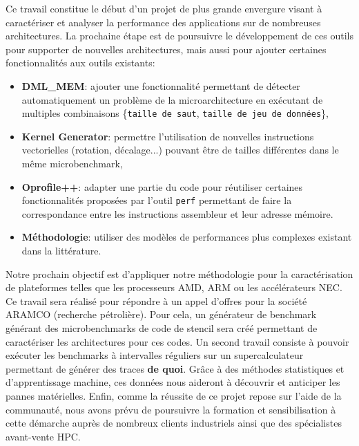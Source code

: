     Ce travail constitue le début d'un projet de plus grande envergure visant à caractériser et analyser la performance des applications sur de nombreuses architectures. La prochaine étape est de poursuivre le développement de ces outils pour supporter de nouvelles architectures, mais aussi pour ajouter certaines fonctionnalités aux outils existants:
    \begin{itemize}
        \item \textbf{DML\_MEM}: ajouter une fonctionnalité permettant de détecter automatiquement un problème de la microarchitecture en exécutant de multiples combinaisons \{\verb|taille de saut|, \verb|taille de jeu de données|\},
        \item \textbf{Kernel Generator}: permettre l'utilisation de nouvelles instructions vectorielles (rotation, décalage...) pouvant être de tailles différentes dans le même microbenchmark,
        \item \textbf{Oprofile++}: adapter une partie du code pour réutiliser certaines fonctionnalités proposées par l'outil \verb|perf| permettant de faire la correspondance entre les instructions assembleur et leur adresse mémoire.
        \item \textbf{Méthodologie}: utiliser des modèles de performances plus complexes existant dans la littérature.
    \end{itemize}

    Notre prochain objectif est d’appliquer notre méthodologie pour la caractérisation de plateformes telles que les processeurs AMD, ARM ou les accélérateurs NEC. Ce travail sera réalisé pour répondre à un appel d’offres pour la société ARAMCO (recherche pétrolière). Pour cela, un générateur de benchmark générant des microbenchmarks de code de stencil sera créé permettant de caractériser les architectures pour ces codes. Un second travail consiste à pouvoir exécuter les benchmarks à intervalles réguliers sur un supercalculateur permettant de générer des traces \textbf{de quoi}. Grâce à des méthodes statistiques et d'apprentissage machine, ces données nous aideront à découvrir et anticiper les pannes matérielles. Enfin, comme la réussite de ce projet repose sur l’aide de la communauté, nous avons prévu de poursuivre la formation et sensibilisation à cette démarche auprès de nombreux clients industriels ainsi que des spécialistes avant-vente HPC.
    


